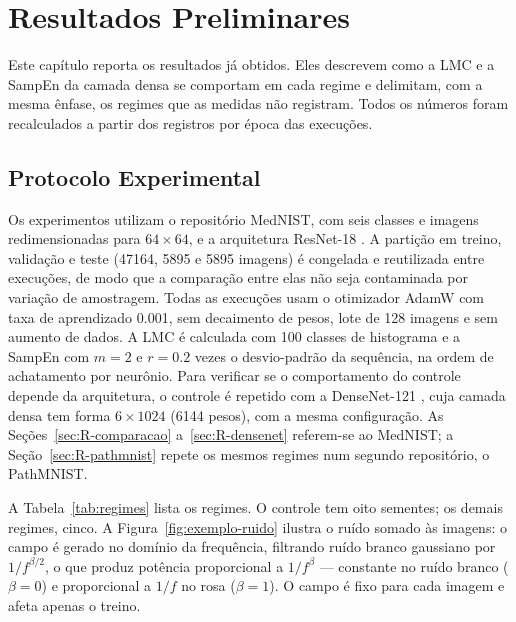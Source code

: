 \chapter{Resultados Preliminares}
\label{cap:resultados}

Este capítulo reporta os resultados já obtidos. Eles descrevem como a LMC e a
SampEn da camada densa se comportam em cada regime e delimitam, com a mesma
ênfase, os regimes que as medidas não registram. Todos os números foram
recalculados a partir dos registros por época das execuções.

\section{Protocolo Experimental}
\label{sec:R-protocolo}

Os experimentos utilizam o repositório MedNIST, com seis classes e imagens
redimensionadas para $64 \times 64$, e a arquitetura ResNet-18 \cite{he2016}.
A partição em treino, validação e teste (\num{47164}, \num{5895} e \num{5895}
imagens) é congelada e reutilizada entre execuções, de modo que a comparação
entre elas não seja contaminada por variação de amostragem. Todas as execuções
usam o otimizador AdamW com taxa de aprendizado \num{0,001}, sem decaimento de
pesos, lote de \num{128} imagens e sem aumento de dados. A LMC é calculada com
\num{100} classes de histograma e a SampEn com $m = 2$ e $r = \num{0,2}$ vezes
o desvio-padrão da sequência, na ordem de achatamento por neurônio. Para
verificar se o comportamento do controle depende da arquitetura, o controle é
repetido com a DenseNet-121 \cite{huang2017}, cuja camada densa tem forma
$6 \times \num{1024}$ (\num{6144} pesos), com a mesma configuração. As
Seções~\ref{sec:R-comparacao} a~\ref{sec:R-densenet} referem-se ao MedNIST; a
Seção~\ref{sec:R-pathmnist} repete os mesmos regimes num segundo repositório,
o PathMNIST.

A Tabela~\ref{tab:regimes} lista os regimes. O controle tem oito sementes; os
demais regimes, cinco. A Figura~\ref{fig:exemplo-ruido} ilustra o ruído somado
às imagens: o campo é gerado no domínio da frequência, filtrando ruído branco
gaussiano por $1/f^{\beta/2}$, o que produz potência proporcional a
$1/f^{\beta}$ --- constante no ruído branco ($\beta = 0$) e proporcional a
$1/f$ no rosa ($\beta = 1$). O campo é fixo para cada imagem e afeta apenas o
treino.

